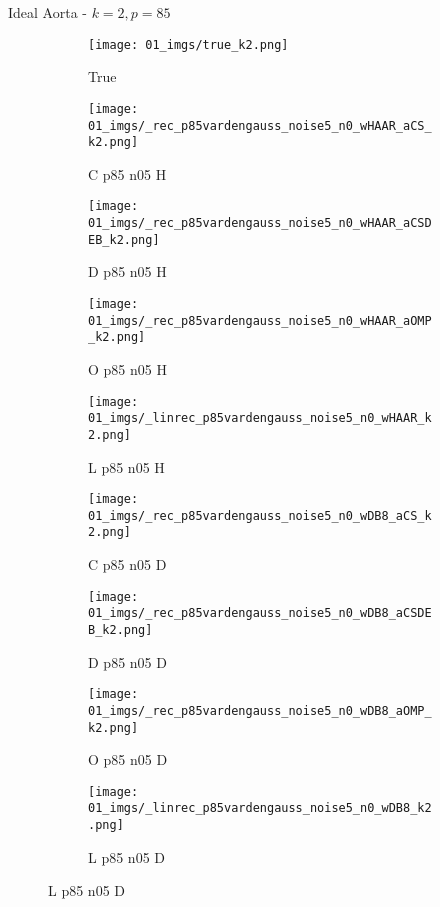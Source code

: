 \begin{frame}{Ideal Aorta - $k=2,p=85$}{}
\begin{figure}

\begin{subfigure}{0.1\textwidth}
\texttt{[image: 01\_imgs/true\_k2.png]}
\caption*{\Tiny True}
\end{subfigure}
\begin{subfigure}{0.1\textwidth}
\texttt{[image: 01\_imgs/\_rec\_p85vardengauss\_noise5\_n0\_wHAAR\_aCS\_k2.png]}
\caption*{\Tiny C p85 n05 H}
\end{subfigure}
\begin{subfigure}{0.1\textwidth}
\texttt{[image: 01\_imgs/\_rec\_p85vardengauss\_noise5\_n0\_wHAAR\_aCSDEB\_k2.png]}
\caption*{\Tiny D p85 n05 H}
\end{subfigure}
\begin{subfigure}{0.1\textwidth}
\texttt{[image: 01\_imgs/\_rec\_p85vardengauss\_noise5\_n0\_wHAAR\_aOMP\_k2.png]}
\caption*{\Tiny O p85 n05 H}
\end{subfigure}
\begin{subfigure}{0.1\textwidth}
\texttt{[image: 01\_imgs/\_linrec\_p85vardengauss\_noise5\_n0\_wHAAR\_k2.png]}
\caption*{\Tiny L p85 n05 H}
\end{subfigure}
\begin{subfigure}{0.1\textwidth}
\texttt{[image: 01\_imgs/\_rec\_p85vardengauss\_noise5\_n0\_wDB8\_aCS\_k2.png]}
\caption*{\Tiny C p85 n05 D}
\end{subfigure}
\begin{subfigure}{0.1\textwidth}
\texttt{[image: 01\_imgs/\_rec\_p85vardengauss\_noise5\_n0\_wDB8\_aCSDEB\_k2.png]}
\caption*{\Tiny D p85 n05 D}
\end{subfigure}
\begin{subfigure}{0.1\textwidth}
\texttt{[image: 01\_imgs/\_rec\_p85vardengauss\_noise5\_n0\_wDB8\_aOMP\_k2.png]}
\caption*{\Tiny O p85 n05 D}
\end{subfigure}
\begin{subfigure}{0.1\textwidth}
\texttt{[image: 01\_imgs/\_linrec\_p85vardengauss\_noise5\_n0\_wDB8\_k2.png]}
\caption*{\Tiny L p85 n05 D}
\end{subfigure}

\vspace{5pt}


\end{figure}
\end{frame}

